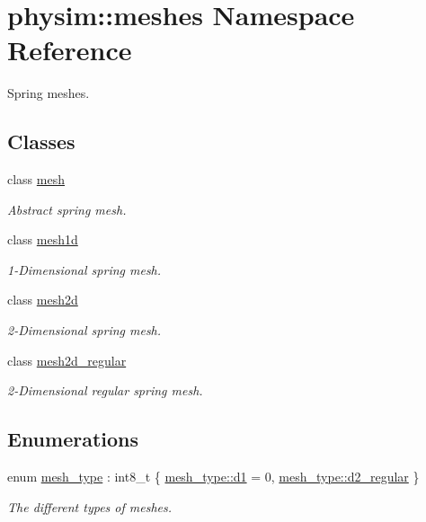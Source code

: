 \hypertarget{namespacephysim_1_1meshes}{}\section{physim\+:\+:meshes Namespace Reference}
\label{namespacephysim_1_1meshes}


Spring meshes.  


\subsection*{Classes}
\begin{DoxyCompactItemize}
\item 
class \hyperlink{classphysim_1_1meshes_1_1mesh}{mesh}
\begin{DoxyCompactList}\small\item\em Abstract spring mesh. \end{DoxyCompactList}\item 
class \hyperlink{classphysim_1_1meshes_1_1mesh1d}{mesh1d}
\begin{DoxyCompactList}\small\item\em 1-\/\+Dimensional spring mesh. \end{DoxyCompactList}\item 
class \hyperlink{classphysim_1_1meshes_1_1mesh2d}{mesh2d}
\begin{DoxyCompactList}\small\item\em 2-\/\+Dimensional spring mesh. \end{DoxyCompactList}\item 
class \hyperlink{classphysim_1_1meshes_1_1mesh2d__regular}{mesh2d\+\_\+regular}
\begin{DoxyCompactList}\small\item\em 2-\/\+Dimensional regular spring mesh. \end{DoxyCompactList}\end{DoxyCompactItemize}
\subsection*{Enumerations}
\begin{DoxyCompactItemize}
\item 
enum \hyperlink{namespacephysim_1_1meshes_a0a3501674fecdbcbbee92c4c3bb68a67}{mesh\+\_\+type} \+: int8\+\_\+t \{ \hyperlink{namespacephysim_1_1meshes_a0a3501674fecdbcbbee92c4c3bb68a67a9948c645c094247794f4c7acdbeb2bb6}{mesh\+\_\+type\+::d1} = 0, 
\hyperlink{namespacephysim_1_1meshes_a0a3501674fecdbcbbee92c4c3bb68a67ab5de808d7817e13049b1c782586af757}{mesh\+\_\+type\+::d2\+\_\+regular}
 \}\begin{DoxyCompactList}\small\item\em The different types of meshes. \end{DoxyCompactList}
\end{DoxyCompactItemize}



